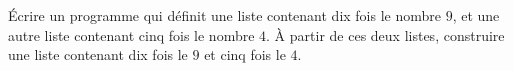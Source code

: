 
\begin{exercice}\label{exoPremiere-0034}

    Écrire un programme qui définit une liste contenant dix fois le nombre \( 9\), et une autre liste contenant cinq fois le nombre \( 4\). À partir de ces deux listes, construire une liste contenant dix fois le \( 9\) et cinq fois le \( 4\).

\end{exercice}
